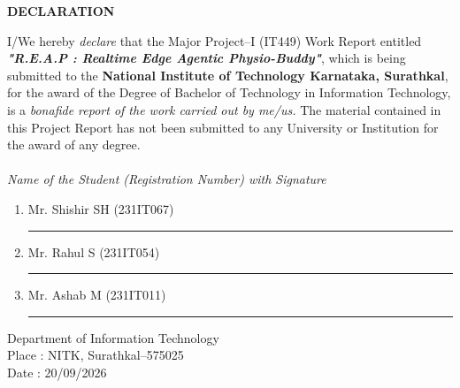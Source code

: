 \documentclass[12pt,a4paper]{report}
\begin{document}
\begin{framed}
    \begin{center}
        \textbf{{\Large DECLARATION}}\\
    \end{center}
    \null
    I/We hereby \textit{declare} that the Major Project--I (IT449) Work Report entitled \textit{\textbf{"R.E.A.P : Realtime Edge Agentic Physio-Buddy"}}, which is being submitted to the \textbf{National Institute of Technology Karnataka, Surathkal}, for the award of the Degree of Bachelor of Technology in Information Technology, is a \textit{bonafide report of the work carried out by me/us.} The material contained in this Project Report has not been submitted to any University or Institution for the award of any degree.
    \\
    \\
    \textit{Name of the Student (Registration Number) with Signature }
    \begin{enumerate}[label={(\arabic*)}]
        \setlength{\itemsep}{0.8em}
        \item Mr. Shishir SH (231IT067) \hfill \rule{4.5cm}{0.4pt}
        \item Mr. Rahul S (231IT054) \hfill \rule{4.5cm}{0.4pt}
        \item Mr. Ashab M (231IT011) \hfill \rule{4.5cm}{0.4pt}
    \end{enumerate}
    \null
    Department of Information Technology \\
    Place     : NITK, Surathkal--575025 \\
    Date      : 20/09/2026 
    \\
    \\
    \\
    \\
    \\
    \\
    \\
    \\
\end{framed}
\clearpage
\end{document}
